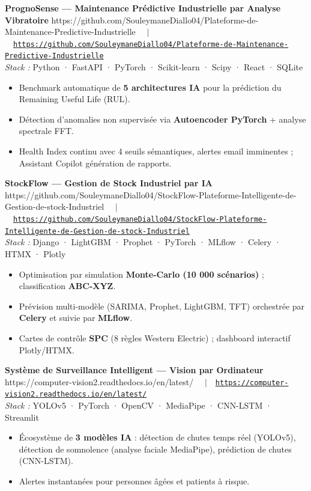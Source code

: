 \documentclass[10pt, a4paper]{article}
\newcommand{\projentry}[3]{%
  \textbf{#1}%
  \ifx\relax#3\relax\else
    \ \ {\small\color{muted}$|$}\ \ {\small\href{#3}{\color{accent}\texttt{#3}}}%
  \fi\\
  {\small\color{muted}\textit{Stack :} #2}%
}
\begin{document}
\projentry{PrognoSense — Maintenance Prédictive Industrielle par Analyse Vibratoire}
          {Python · FastAPI · PyTorch · Scikit-learn · Scipy · React · SQLite}
          {https://github.com/SouleymaneDiallo04/Plateforme-de-Maintenance-Predictive-Industrielle}

\vspace{4pt}
\begin{itemize}
  \item Benchmark automatique de \textbf{5 architectures IA} pour la prédiction du Remaining Useful Life (RUL).
  \item Détection d'anomalies non supervisée via \textbf{Autoencoder PyTorch} + analyse spectrale FFT.
  \item Health Index continu avec 4 seuils sémantiques, alertes email imminentes ; Assistant Copilot génération de rapports.
\end{itemize}

\vspace{6pt}

\projentry{StockFlow — Gestion de Stock Industriel par IA}
          {Django · LightGBM · Prophet · PyTorch · MLflow · Celery · HTMX · Plotly}
          {https://github.com/SouleymaneDiallo04/StockFlow-Plateforme-Intelligente-de-Gestion-de-stock-Industriel}

\vspace{4pt}
\begin{itemize}
  \item Optimisation par simulation \textbf{Monte-Carlo (10 000 scénarios)} ; classification \textbf{ABC-XYZ}.
  \item Prévision multi-modèle (SARIMA, Prophet, LightGBM, TFT) orchestrée par \textbf{Celery} et suivie par \textbf{MLflow}.
  \item Cartes de contrôle \textbf{SPC} (8 règles Western Electric) ; dashboard interactif Plotly/HTMX.
\end{itemize}

\vspace{6pt}

\projentry{Système de Surveillance Intelligent — Vision par Ordinateur}
          {YOLOv5 · PyTorch · OpenCV · MediaPipe · CNN-LSTM · Streamlit}
          {https://computer-vision2.readthedocs.io/en/latest/}

\vspace{4pt}
\begin{itemize}
  \item Écosystème de \textbf{3 modèles IA} : détection de chutes temps réel (YOLOv5), détection de somnolence (analyse faciale MediaPipe), prédiction de chutes (CNN-LSTM).
  \item Alertes instantanées pour personnes âgées et patients à risque.
\end{itemize}
\end{document}
